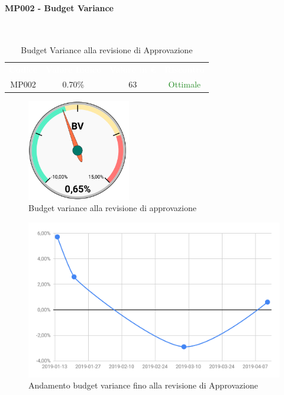 \paragraph{MP002 - Budget Variance}\mbox{}\\[0,3cm]
    \begin{table}[H]
        \centering
        \begin{tabular}{cccc}
            \rowcolor{greySWEight}
            \textcolor{white}{\textbf{Codice}} &
            \textcolor{white}{\textbf{Valore Indice}}&
            \textcolor{white}{\textbf{Valore in €}}&
            \textcolor{white}{\textbf{Riscontro}}\\
            MP002 & 0.70\% & 63 & \textcolor{ForestGreen}{Ottimale}\\
        \end{tabular}
        \caption{Budget Variance alla revisione di Approvazione}
    \end{table}
    \begin{figure}[H]
        \centering
        \includegraphics[width=45mm]{sez/App_Esito/Approvazione/graph/budgetVarianceRA.pdf}
        \caption{Budget variance alla revisione di approvazione}
    \end{figure}
    \begin{figure}[H]
        \centering
        \includegraphics[width=0.7\linewidth]{sez/App_Esito/Approvazione/graph/budgetVarianceRAStorico.pdf}
        \caption{Andamento budget variance fino alla revisione di Approvazione}
    \end{figure}
    \newpage